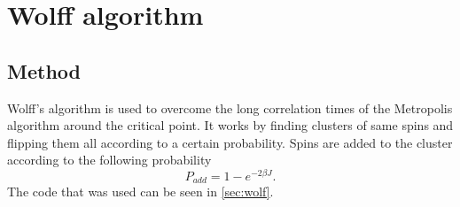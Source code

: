 \documentclass[a4paper]{article}
\begin{document}
\section{Wolff algorithm}
\subsection{Method}
Wolff's algorithm is used to overcome the long correlation times of the Metropolis algorithm around the critical point. It works by finding clusters of same spins and flipping them all according to a certain probability. Spins are added to the cluster according to the following probability
\begin{equation}
P_{add} = 1-e^{-2\beta J}.
\end{equation}
The code that was used can be seen in \autoref{sec:wolf}.
\end{document}

